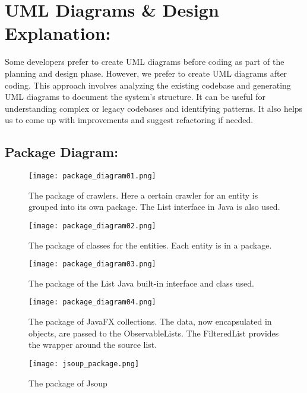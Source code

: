 \documentclass[a4paper,10pt,notitlepage]{article}
\begin{document}
{\section{\textbf{UML Diagrams & Design Explanation:}}
Some developers prefer to create UML diagrams before coding as part of the planning
and design phase. However, we prefer to create UML diagrams after coding. This
approach involves analyzing the existing codebase and generating UML diagrams to
document the system's structure.
It can be useful for understanding complex or legacy codebases and identifying
patterns. It also helps us to come up with improvements and suggest refactoring if
needed.
\subsection{Package Diagram:}
    \begin{figure}[h]
        \centering
        \texttt{[image: package\_diagram01.png]}
        \caption{The package of crawlers. Here a certain crawler for an entity is grouped into its own package. The List interface in Java is also used.}
    \end{figure}
    \newpage
    
    \begin{figure}[h]
        \centering
        \texttt{[image: package\_diagram02.png]}
        \caption{The package of classes for the entities. Each entity is in a package.}
    \end{figure}
    
    \hspace{2cm}
    \begin{figure}[h]
        \centering
        \texttt{[image: package\_diagram03.png]}
        \caption{The package of the List Java built-in interface and class used.}
    \end{figure}

   \hspace{2cm}
    \begin{figure}[h]
        \centering
        \texttt{[image: package\_diagram04.png]}
        \caption{The package of JavaFX collections. The data, now encapsulated in objects, are passed to the ObservableLists. The FilteredList provides the wrapper around the source list.}
    \end{figure}
    \newpage
    \begin{figure}[h]
        \centering
        \texttt{[image: jsoup\_package.png]}
        \caption{The package of Jsoup}
    \end{figure}
    
}
\end{document}
